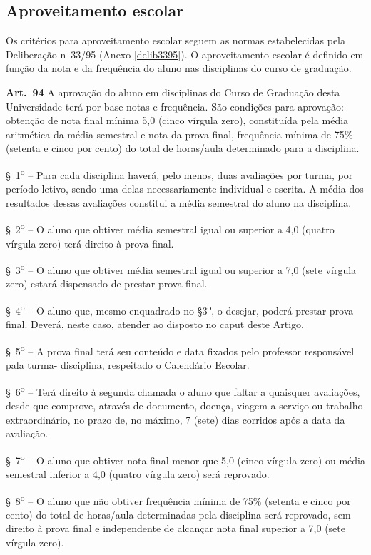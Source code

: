 \subsection{Aproveitamento escolar}
Os critérios para aproveitamento escolar seguem as normas estabelecidas pela Deliberação n\textordmasculine~33/95 (Anexo \ref{delib3395}). O aproveitamento escolar é definido em função da nota e da frequência do aluno nas disciplinas do curso de graduação.
\begin{itquotation}

    \textbf{Art.~94} A aprovação do aluno em disciplinas do Curso de Graduação desta Universidade terá por base notas e frequência. São condições para aprovação: obtenção de nota final mínima 5,0 (cinco vírgula zero), constituída pela média aritmética da média semestral e nota da prova final, frequência mínima de 75\% (setenta e cinco por cento) do total de horas/aula determinado para a disciplina.

    \S~1\textsuperscript{o} -- Para cada disciplina haverá, pelo menos, duas avaliações por turma, por período letivo, sendo uma delas necessariamente individual e escrita. A média dos resultados dessas avaliações constitui a média semestral do aluno na disciplina.

    \S~2\textsuperscript{o} -- O aluno que obtiver média semestral igual ou superior a 4,0 (quatro vírgula zero) terá direito à prova final.

    \S~3\textsuperscript{o} -- O aluno que obtiver média semestral igual ou superior a 7,0 (sete vírgula zero) estará dispensado de prestar prova final.

    \S~4\textsuperscript{o} -- O aluno que, mesmo enquadrado no \S 3\textsuperscript{o}, o desejar, poderá prestar prova final. Deverá, neste caso, atender ao disposto no caput deste Artigo.

    \S~5\textsuperscript{o} -- A prova final terá seu conteúdo e data fixados pelo professor responsável pala turma-
    disciplina, respeitado o Calendário Escolar.

    \S~6\textsuperscript{o} -- Terá direito à segunda chamada o aluno que faltar a quaisquer avaliações, desde que
    comprove, através de documento, doença, viagem a serviço ou trabalho extraordinário, no prazo de,
    no máximo, 7 (sete) dias corridos após a data da avaliação.

    \S~7\textsuperscript{o} -- O aluno que obtiver nota final menor que 5,0 (cinco vírgula zero) ou média semestral inferior a 4,0 (quatro vírgula zero) será reprovado.

    \S~8\textsuperscript{o} -- O aluno que não obtiver frequência mínima de 75\% (setenta e cinco por cento) do total de horas/aula determinadas pela disciplina será reprovado, sem direito à prova final e independente de alcançar nota final superior a 7,0 (sete vírgula zero).
\end{itquotation}


